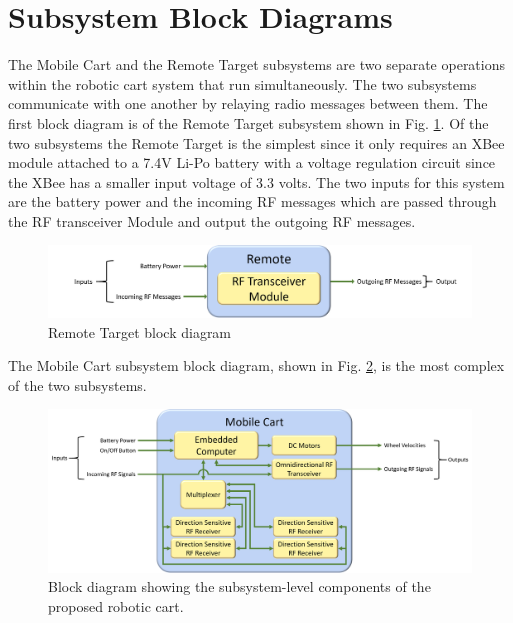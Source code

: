 \section{Subsystem Block Diagrams}
The Mobile Cart and the Remote Target subsystems are two separate operations
within the robotic cart system that run simultaneously. The two subsystems
communicate with one another by relaying radio messages between them. The first
block diagram is of the Remote Target subsystem shown in Fig.
\ref{fig:remote_block_diag}. Of the two subsystems the Remote Target is the
simplest since it only requires an XBee module attached to a 7.4V Li-Po battery
with a voltage regulation circuit since the XBee has a smaller input voltage of
3.3 volts. The two inputs for this system are the battery power and the incoming
RF messages which are passed through the RF transceiver Module and output the
outgoing RF messages. %
%
\begin{figure}
  \centering
  \includegraphics[width=\textwidth]{figs/img/remoteBlockDiagram.png}
  \caption{Remote Target block diagram}
  \label{fig:remote_block_diag}
\end{figure}
%


The Mobile Cart subsystem block diagram, shown in Fig.
\ref{fig:mobile_block_diag}, is the most complex of the two subsystems. %
%
\begin{figure}
  \centering
  \includegraphics[width=\textwidth]{figs/img/mobileCartBlockDiagram.png}
  \caption{Block diagram showing the subsystem-level components of the proposed robotic cart.}
  \label{fig:mobile_block_diag}
\end{figure}
%


